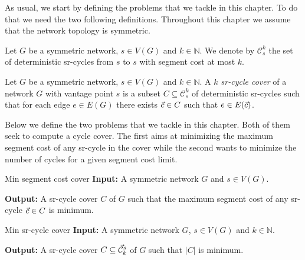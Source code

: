 
As usual, we start by defining the problems that we tackle in this chapter. To do that we need the two following definitions.
Throughout this chapter we assume that the network topology is symmetric.

\begin{definition}
Let $G$ be a symmetric network, $s \in V(G)$ and $k \in \mathbb{N}$. We denote by $\mathcal{C}^k_s$ the set of deterministic sr-cycles from $s$ to $s$ with segment cost at most $k$.
\end{definition}

\begin{definition}
Let $G$ be a symmetric network, $s \in V(G)$ and $k \in \mathbb{N}$. A \emph{$k$ sr-cycle cover} of a network $G$ 
with vantage point $s$ is a subset $C \subseteq \mathcal{C}^k_s$ of deterministic sr-cycles such
that for each edge $e \in E(G)$ there exists $\vec{c} \in C$ such that $e \in E(\vec{c})$.
\end{definition}

Below we define the two problems that we tackle in this chapter. Both of them seek to compute a cycle cover.
The first aims at minimizing the maximum segment cost of any sr-cycle in the cover while the second wants to minimize the number of cycles for a given segment cost limit.


\begin{problem}{Min segment cost cover}
\label{prob:min-seg-cover}
\textbf{Input:} A symmetric network $G$ and $s \in V(G)$.

\textbf{Output:} A sr-cycle cover $C$ of $G$ such that the maximum segment cost of any sr-cycle $\vec{c} \in C$ is minimum.
\end{problem}

\begin{problem}{Min sr-cycle cover}
\label{prob:min-cycle-cover}
\textbf{Input:} A symmetric network $G$, $s \in V(G)$ and $k \in \mathbb{N}$.

\textbf{Output:} A sr-cycle cover $C \subseteq \mathcal{\vec{C}}^s_k$ of $G$ such that $|C|$ is minimum.
\end{problem}
% 
% 
% 
